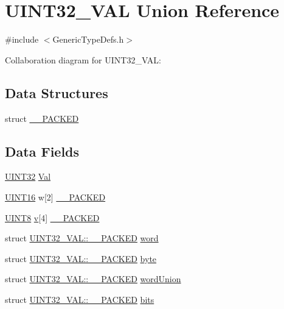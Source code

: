 \hypertarget{union_u_i_n_t32___v_a_l}{}\section{U\+I\+N\+T32\+\_\+\+V\+A\+L Union Reference}
\label{union_u_i_n_t32___v_a_l}


{\ttfamily \#include $<$Generic\+Type\+Defs.\+h$>$}



Collaboration diagram for U\+I\+N\+T32\+\_\+\+V\+A\+L\+:
\subsection*{Data Structures}
\begin{DoxyCompactItemize}
\item 
struct \hyperlink{struct_u_i_n_t32___v_a_l_1_1_____p_a_c_k_e_d}{\+\_\+\+\_\+\+P\+A\+C\+K\+E\+D}
\end{DoxyCompactItemize}
\subsection*{Data Fields}
\begin{DoxyCompactItemize}
\item 
\hyperlink{_generic_type_defs_8h_a1720f33f59b583f0c2ed071815623a86}{U\+I\+N\+T32} \hyperlink{union_u_i_n_t32___v_a_l_a527005b57a2b53412e52f63dcfa2f61b}{Val}
\item 
\hyperlink{_generic_type_defs_8h_acfa284fa8026c4aace2728f7f15d6c13}{U\+I\+N\+T16} w\mbox{[}2\mbox{]} \hyperlink{union_u_i_n_t32___v_a_l_a9f9202d9cccd6e4a1faa633683d49ac6}{\+\_\+\+\_\+\+P\+A\+C\+K\+E\+D}
\item 
\hyperlink{_generic_type_defs_8h_ab27e9918b538ce9d8ca692479b375b6a}{U\+I\+N\+T8} \hyperlink{_s_p_i_flash_8c_a51a3fc6fe361f8f5a7a91799fecd2c9a}{v}\mbox{[}4\mbox{]} \hyperlink{union_u_i_n_t32___v_a_l_ae73a72872d1fc4d202ce80eacc280e8b}{\+\_\+\+\_\+\+P\+A\+C\+K\+E\+D}
\item 
struct \hyperlink{struct_u_i_n_t32___v_a_l_1_1_____p_a_c_k_e_d}{U\+I\+N\+T32\+\_\+\+V\+A\+L\+::\+\_\+\+\_\+\+P\+A\+C\+K\+E\+D} \hyperlink{union_u_i_n_t32___v_a_l_ae2346b794b5d9cf89e58ecf390a2680e}{word}
\item 
struct \hyperlink{struct_u_i_n_t32___v_a_l_1_1_____p_a_c_k_e_d}{U\+I\+N\+T32\+\_\+\+V\+A\+L\+::\+\_\+\+\_\+\+P\+A\+C\+K\+E\+D} \hyperlink{union_u_i_n_t32___v_a_l_a0a29939c26754944b3f1e6c3f2eddd50}{byte}
\item 
struct \hyperlink{struct_u_i_n_t32___v_a_l_1_1_____p_a_c_k_e_d}{U\+I\+N\+T32\+\_\+\+V\+A\+L\+::\+\_\+\+\_\+\+P\+A\+C\+K\+E\+D} \hyperlink{union_u_i_n_t32___v_a_l_a71f9132c3cce99757210e63429f10b3c}{word\+Union}
\item 
struct \hyperlink{struct_u_i_n_t32___v_a_l_1_1_____p_a_c_k_e_d}{U\+I\+N\+T32\+\_\+\+V\+A\+L\+::\+\_\+\+\_\+\+P\+A\+C\+K\+E\+D} \hyperlink{union_u_i_n_t32___v_a_l_a47eaf0c7ae358afaa10099eae3dffe0d}{bits}
\end{DoxyCompactItemize}


